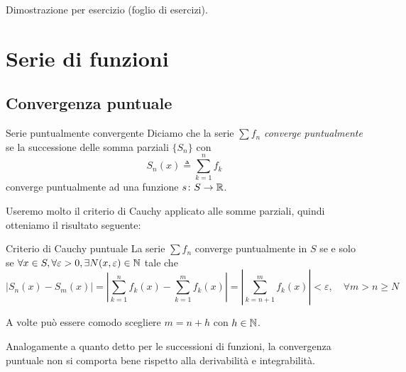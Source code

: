 \documentclass[a4paper]{article}
\begin{document}
\begin{radioactive}
\begin{snippetproof}{}
    Dimostrazione per esercizio (foglio di esercizi).
\end{snippetproof}
\end{radioactive}
\section{Serie di funzioni}

\subsection{Convergenza puntuale}

\begin{radioactive}
\begin{snippetdefinition}{Serie puntualmente convergente}
    Diciamo che la serie \(\sum f_n\) \emph{converge puntualmente}
    se la successione delle somma parziali \(\{S_n\}\) con
    \[
        S_n(x) \triangleq \sum_{k=1}^n f_k
    \]
    converge puntualmente ad una funzione \(s \colon S \to \mathbb{R}\).
\end{snippetdefinition}
\end{radioactive}

\begin{radioactive}
Useremo molto il criterio di Cauchy
applicato alle somme parziali, quindi otteniamo il risultato seguente:
\end{radioactive}

\begin{radioactive}
\begin{snippetproposition}{Criterio di Cauchy puntuale}
    La serie \(\sum f_n\) converge puntualmente in \(S\)
    se e solo se \(\forall x \in S, \forall \varepsilon > 0, \exists N(x, \varepsilon) \in \mathbb{N}\)
    tale che
    \[
        |S_n(x) - S_m(x)| = \left|
        \sum_{k=1}^n f_k(x) - \sum_{k=1}^m f_k(x)
        \right| = \left|
        \sum_{k=n+1}^m f_k(x)
        \right| < \varepsilon, \quad \forall m > n \geq N
    \]
\end{snippetproposition}
\end{radioactive}

\begin{radioactive}
A volte può essere comodo scegliere \(m=n+h\) con \(h \in \mathbb{N}\).
\end{radioactive}

\begin{radioactive}
Analogamente a quanto detto per le successioni di funzioni,
la convergenza puntuale non si comporta bene rispetto alla derivabilità e integrabilità.
\end{radioactive}
\end{document}
